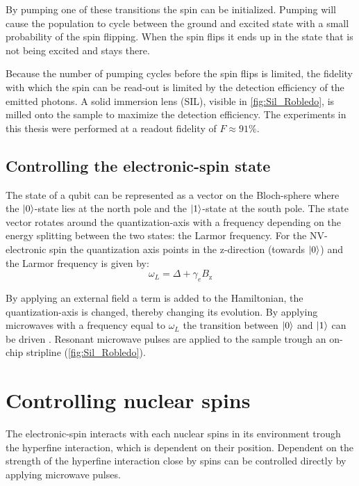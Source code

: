 By pumping one of these transitions the spin can be initialized.
Pumping will cause the population to cycle between the ground and excited state with a small probability of the spin flipping.
When the spin flips it ends up in the state that is not being excited and stays there.

Because the number of pumping cycles before the spin flips is limited, the fidelity with which the spin can be read-out is limited by the detection efficiency of the emitted photons.
A solid immersion lens (SIL), visible in \cref{fig:Sil_Robledo}, is milled onto the sample to maximize the detection efficiency.
The experiments in this thesis were performed at a readout fidelity of $F\approx 91\%$.

\subsection{Controlling the electronic-spin state}
The state of a qubit can be represented as a vector on the Bloch-sphere where the ${\left\vert{0}\right\rangle}$-state lies at the north pole and the ${\left\vert{1}\right\rangle}$-state at the south pole.
The state vector rotates around the quantization-axis with a frequency depending on the energy splitting between the two states: the Larmor frequency.
For the NV-electronic spin the quantization axis points in the z-direction (towards ${\left\vert{0}\right\rangle}$) and the  Larmor frequency is given by:
\begin{equation}
    \omega_L =\Delta + \gamma_e {B_\mathrm{z}}
    \label{eq:larmor_electronic_spin}
\end{equation}


By applying an external field a term is added to the Hamiltonian, the quantization-axis is changed, thereby changing its evolution.
By applying microwaves with a frequency equal to $\omega_L$ the transition between ${\left\vert{0}\right\rangle}$ and ${\left\vert{1}\right\rangle}$ can be driven \citep{Jelezko2004Observation}.
Resonant microwave pulses are applied to the sample trough an on-chip stripline (\cref{fig:Sil_Robledo}).

\section{Controlling nuclear spins}
The electronic-spin interacts with each nuclear spins in its environment trough the hyperfine interaction, which is dependent on their position.
Dependent on the strength of the hyperfine interaction close by spins can be controlled directly by applying microwave pulses.

